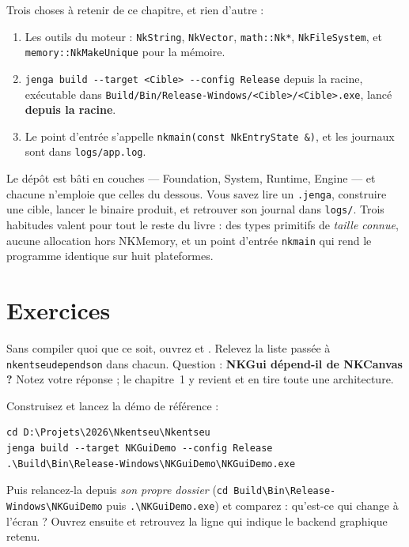 \begin{nkretenir}
Trois choses à retenir de ce chapitre, et rien d'autre :
\begin{enumerate}
  \item Les outils du moteur : \texttt{NkString}, \texttt{NkVector},
        \texttt{math::Nk*}, \texttt{NkFileSystem}, et
        \texttt{memory::NkMakeUnique} pour la mémoire.
  \item \texttt{jenga build -{}-target <Cible> -{}-config Release} depuis la
        racine, exécutable dans
        \texttt{Build/Bin/Release-Windows/<Cible>/<Cible>.exe}, lancé
        \textbf{depuis la racine}.
  \item Le point d'entrée s'appelle \texttt{nkmain(const NkEntryState \&)}, et
        les journaux sont dans \texttt{logs/app.log}.
\end{enumerate}
\end{nkretenir}

\begin{nkbilan}
Le dépôt est bâti en couches --- Foundation, System, Runtime, Engine --- et
chacune n'emploie que celles du dessous. Vous savez lire un \texttt{.jenga},
construire une cible, lancer le binaire produit, et retrouver son journal dans
\texttt{logs/}. Trois habitudes valent pour tout le reste du livre : des types
primitifs de \emph{taille connue}, aucune allocation hors NKMemory, et un point
d'entrée \texttt{nkmain} qui rend le programme identique sur huit plateformes.
\end{nkbilan}

\section{Exercices}

\begin{nklogique}
Sans compiler quoi que ce soit, ouvrez 
et . Relevez la liste passée à
\texttt{nkentseudependson} dans chacun. Question : \textbf{NKGui dépend-il de
NKCanvas ?} Notez votre réponse ; le chapitre~1 y revient et en tire toute une
architecture.
\end{nklogique}

\begin{nkpratique}
Construisez et lancez la démo de référence :
\begin{verbatim}
cd D:\Projets\2026\Nkentseu\Nkentseu
jenga build --target NKGuiDemo --config Release
.\Build\Bin\Release-Windows\NKGuiDemo\NKGuiDemo.exe
\end{verbatim}
Puis relancez-la depuis \emph{son propre dossier} (\texttt{cd
Build\textbackslash Bin\textbackslash Release-Windows\textbackslash NKGuiDemo}
puis \texttt{.\textbackslash NKGuiDemo.exe}) et comparez : qu'est-ce qui change à
l'écran ? Ouvrez ensuite  et retrouvez la ligne qui indique
le backend graphique retenu.
\end{nkpratique}

